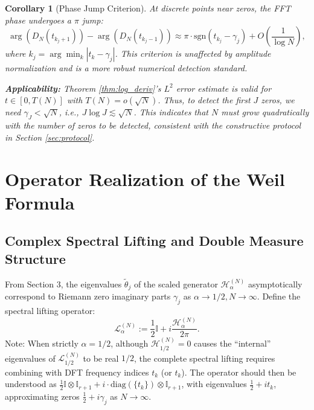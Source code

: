 \documentclass[12pt,a4paper]{amsart}
\theoremstyle{plain}
\newtheorem{corollary}[theorem]{Corollary}
\theoremstyle{definition}
\theoremstyle{remark}
\begin{document}
\begin{corollary}[Phase Jump Criterion]\label{cor:phase_jump}
At discrete points near zeros, the FFT phase undergoes a $\pi$ jump:
\begin{equation}
\arg(D_N(t_{k_j+1})) - \arg(D_N(t_{k_j-1})) \approx \pi \cdot \mathrm{sgn}(t_{k_j} - \gamma_j) + O\left(\frac{1}{\log N}\right),
\end{equation}
where $k_j = \arg\min_k |t_k - \gamma_j|$. This criterion is unaffected by amplitude normalization and is a more robust numerical detection standard.

\textbf{Applicability:} Theorem \ref{thm:log_deriv}'s $L^2$ error estimate is valid for $t \in [0, T(N)]$ with $T(N) = o(\sqrt{N})$. Thus, to detect the first $J$ zeros, we need $\gamma_J < \sqrt{N}$, i.e., $J \log J \lesssim \sqrt{N}$. This indicates that $N$ must grow quadratically with the number of zeros to be detected, consistent with the constructive protocol in Section \ref{sec:protocol}.
\end{corollary}

\section{Operator Realization of the Weil Formula}

\subsection{Complex Spectral Lifting and Double Measure Structure}

From Section 3, the eigenvalues $\tilde{\theta}_j$ of the scaled generator $\mathcal{H}_\alpha^{(N)}$ asymptotically correspond to Riemann zero imaginary parts $\gamma_j$ as $\alpha\to1/2, N\to\infty$. Define the spectral lifting operator:
\begin{equation}
\mathcal{L}_\alpha^{(N)} := \frac{1}{2}\mathbb{I} + i\frac{\mathcal{H}_\alpha^{(N)}}{2\pi}.
\end{equation}
Note: When strictly $\alpha=1/2$, although $\mathcal{H}_{1/2}^{(N)}=0$ causes the ``internal'' eigenvalues of $\mathcal{L}_{1/2}^{(N)}$ to be real $1/2$, the complete spectral lifting requires combining with DFT frequency indices $t_k$ (or $t_k$). The operator should then be understood as $\frac{1}{2}\mathbb{I} \otimes \mathbb{I}_{r+1} + i\cdot \mathrm{diag}(\{t_k\}) \otimes \mathbb{I}_{r+1}$, with eigenvalues $\frac{1}{2} + i t_k$, approximating zeros $\frac{1}{2}+i\gamma_j$ as $N\to\infty$.
\end{document}
